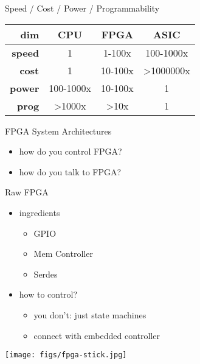 \begin{frame}[fragile]{Speed / Cost / Power / Programmability}

\begin{center}
\begin{tabular}{|r|c|c|c|}
\hline
{\bf dim} & {\bf CPU} & {\bf FPGA} & {\bf ASIC} \\
\hline
{\bf speed} & 1 & 1-100x & 100-1000x \\
\hline
{\bf cost} & 1 & 10-100x & >1000000x \\
\hline
{\bf power} & 100-1000x & 10-100x & 1 \\
\hline
{\bf prog} & >1000x & >10x & 1 \\
\hline
\end{tabular}
\end{center}

\end{frame}

\begin{frame}[fragile]{FPGA System Architectures}

\begin{itemize}
\item how do you control FPGA?
\item how do you talk to FPGA?
\end{itemize}

\end{frame}

\begin{frame}[fragile]{Raw FPGA}

\begin{itemize}
\item ingredients
\begin{itemize}
\item GPIO
\item Mem Controller
\item Serdes
\end{itemize}
\item how to control?
\begin{itemize}
\item you don't: just state machines
\item connect with embedded controller
\end{itemize}
\end{itemize}

\begin{center}
\texttt{[image: figs/fpga-stick.jpg]}
\end{center}

\end{frame}

